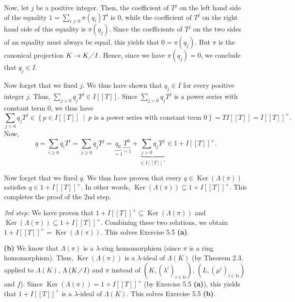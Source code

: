 \documentclass[numbers=enddot,12pt,final,onecolumn,notitlepage]{scrartcl}%
\begin{document}
Now, let $j$ be a positive integer. Then, the coefficient of $T^{j}$ on the
left hand side of the equality $1=\sum\limits_{i\geq0}\pi\left(  q_{i}\right)
T^{i}$ is $0$, while the coefficient of $T^{j}$ on the right hand side of this
equality is $\pi\left(  q_{j}\right)  $. Since the coefficients of $T^{j}$ on
the two sides of an equality must always be equal, this yields that
$0=\pi\left(  q_{j}\right)  $. But $\pi$ is the canonical projection
$K\rightarrow K\diagup I$. Hence, since we have $\pi\left(  q_{j}\right)  =0$,
we conclude that $q_{j}\in I$.

Now forget that we fixed $j$. We thus have shown that $q_{j}\in I$ for every
positive integer $j$. Thus, $\sum\limits_{j>0}q_{j}T^{j}\in I\left[  \left[
T\right]  \right]  $. Since $\sum\limits_{j>0}q_{j}T^{j}$ is a power series
with constant term $0$, we thus have%
\[
\sum\limits_{j>0}q_{j}T^{j}\in\left\{  p\in I\left[  \left[  T\right]
\right]  \ \mid\ p\text{ is a power series with constant term }0\right\}
=TI\left[  \left[  T\right]  \right]  =I\left[  \left[  T\right]  \right]
^{+}.
\]
Now,%
\[
q=\sum\limits_{i\geq0}q_{i}T^{i}=\sum\limits_{j\geq0}q_{j}T^{j}%
=\underbrace{q_{0}}_{=1}\underbrace{T^{0}}_{=1}+\underbrace{\sum
\limits_{j>0}q_{j}T^{j}}_{\in I\left[  \left[  T\right]  \right]  ^{+}}%
\in1+I\left[  \left[  T\right]  \right]  ^{+}.
\]


Now forget that we fixed $q$. We thus have proven that every $q\in
\operatorname*{Ker}\left(  \Lambda\left(  \pi\right)  \right)  $ satisfies
$q\in1+I\left[  \left[  T\right]  \right]  ^{+}$. In other words,
$\operatorname*{Ker}\left(  \Lambda\left(  \pi\right)  \right)  \subseteq
1+I\left[  \left[  T\right]  \right]  ^{+}$. This completes the proof of the
2nd step.

\textit{3rd step:} We have proven that $1+I\left[  \left[  T\right]  \right]
^{+}\subseteq\operatorname*{Ker}\left(  \Lambda\left(  \pi\right)  \right)  $
and $\operatorname*{Ker}\left(  \Lambda\left(  \pi\right)  \right)
\subseteq1+I\left[  \left[  T\right]  \right]  ^{+}$. Combining these two
relations, we obtain $1+I\left[  \left[  T\right]  \right]  ^{+}%
=\operatorname*{Ker}\left(  \Lambda\left(  \pi\right)  \right)  $. This solves
Exercise 5.5 \textbf{(a)}.

\textbf{(b)} We know that $\Lambda\left(  \pi\right)  $ is a $\lambda$-ring
homomorphism (since $\pi$ is a ring homomorphism). Thus, $\operatorname*{Ker}%
\left(  \Lambda\left(  \pi\right)  \right)  $ is a $\lambda$-ideal of
$\Lambda\left(  K\right)  $ (by Theorem 2.3, applied to $\Lambda\left(
K\right)  $, $\Lambda\left(  K\diagup I\right)  $ and $\pi$ instead of
$\left(  K,\left(  \lambda^{i}\right)  _{i\in\mathbb{N}}\right)  $, $\left(
L,\left(  \mu^{i}\right)  _{i\in\mathbb{N}}\right)  $ and $f$). Since
$\operatorname*{Ker}\left(  \Lambda\left(  \pi\right)  \right)  =1+I\left[
\left[  T\right]  \right]  ^{+}$ (by Exercise 5.5 \textbf{(a)}), this yields
that $1+I\left[  \left[  T\right]  \right]  ^{+}$ is a $\lambda$-ideal of
$\Lambda\left(  K\right)  $. This solves Exercise 5.5 \textbf{(b)}.
\end{document}
